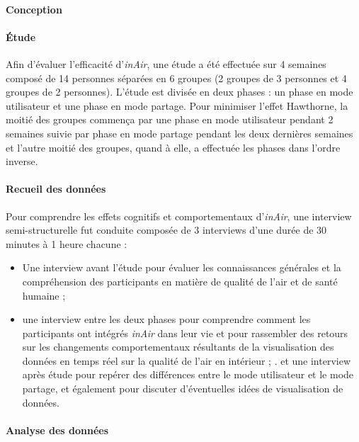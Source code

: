 \documentclass[10pt,a5paper,twoside]{article}
\begin{document}
\paragraph{Conception}\label{conception-2}

\paragraph{Étude}\label{uxe9tude-2}

Afin d'évaluer l'efficacité d'\emph{inAir}, une étude a été effectuée
sur 4 semaines composé de 14 personnes séparées en 6 groupes (2 groupes
de 3 personnes et 4 groupes de 2 personnes). L'étude est divisée en deux
phases : un phase en mode utilisateur et une phase en mode partage. Pour
minimiser l'effet Hawthorne, la moitié des groupes commença par une
phase en mode utilisateur pendant 2 semaines suivie par phase en mode
partage pendant les deux dernières semaines et l'autre moitié des
groupes, quand à elle, a effectuée les phases dans l'ordre inverse.

\paragraph{Recueil des données}\label{recueil-des-donnuxe9es-1}

Pour comprendre les effets cognitifs et comportementaux d'\emph{inAir},
une interview semi-structurelle fut conduite composée de 3 interviews
d'une durée de 30 minutes à 1 heure chacune :

\begin{itemize}
\itemsep1pt\parskip0pt
\item
  Une interview avant l'étude pour évaluer les connaissances générales
  et la compréhension des participants en matière de qualité de l'air et
  de santé humaine ;
\item
  une interview entre les deux phases pour comprendre comment les
  participants ont intégrés \emph{inAir} dans leur vie et pour
  rassembler des retours sur les changements comportementaux résultants
  de la visualisation des données en temps réel sur la qualité de l'air
  en intérieur ; . et une interview après étude pour repérer des
  différences entre le mode utilisateur et le mode partage, et également
  pour discuter d'éventuelles idées de visualisation de données.
\end{itemize}

\paragraph{Analyse des données}\label{analyse-des-donnuxe9es}
\end{document}
